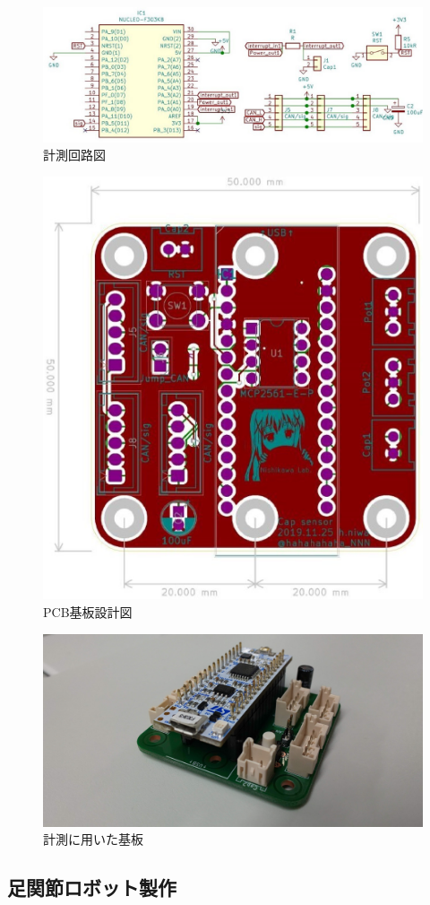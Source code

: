 \begin{figure}[h]
    \begin{center}
        \includegraphics[width=0.7\columnwidth,clip]{2_measurement/circuitPicture.eps}
        \caption{計測回路図}
        \label{fig:circuitPic}
    \end{center}
\end{figure}
\begin{figure}[h]
    \begin{center}
        \includegraphics[width=0.4\columnwidth,clip]{2_measurement/PCB.eps}
        \caption{PCB基板設計図}
        \label{fig:PCB}
    \end{center}
\end{figure}
\begin{figure}[h]
    \begin{center}
     \includegraphics[width=0.6\columnwidth,clip]{./2_measurement/circuit.eps}
     \caption{計測に用いた基板}
     \label{fig:circuit}
    \end{center}
\end{figure}

\subsection{足関節ロボット製作}

